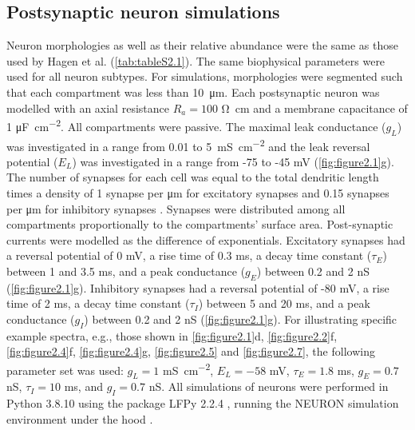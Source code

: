 \subsection{Postsynaptic neuron simulations}
Neuron morphologies as well as their relative abundance were the same as those used by Hagen et al. \cite{Hagen2016} (\autoref{tab:tableS2.1}). The same biophysical parameters were used for all neuron subtypes. For simulations, morphologies were segmented such that each compartment was less than \qty{10}{\micro\meter}. Each postsynaptic neuron was modelled with an axial resistance $R_a=100$ \unit{\ohm \centi\meter} and a membrane capacitance of 1 \unit{\micro\farad\per\centi\meter\squared}. All compartments were passive. The maximal leak conductance ($g_L$) was investigated in a range from 0.01 to \qty{5}{\milli\siemens\per\centi\meter\squared} and the leak reversal potential ($E_L$) was investigated in a range from -75 to -45 \unit{\milli\volt} (\autoref{fig:figure2.1}g). The number of synapses for each cell was equal to the total dendritic length times a density of 1 synapse per \unit{\micro\meter} for excitatory synapses and 0.15 synapses per \unit{\micro\meter} for inhibitory synapses \cite{Iacaruso2017, Karimi2020, Palmer2012}. Synapses were distributed among all compartments proportionally to the compartments’ surface area. Post-synaptic currents were modelled as the difference of exponentials. Excitatory synapses had a reversal potential of 0 \unit{\milli\volt}, a rise time of 0.3 ms, a decay time constant ($\tau_E$) between 1 and 3.5 ms, and a peak conductance ($g_E$) between 0.2 and 2 \unit{\nano\siemens} (\autoref{fig:figure2.1}g). Inhibitory synapses had a reversal potential of -80 \unit{\milli\volt}, a rise time of 2 ms, a decay time constant ($\tau_I$) between 5 and 20 ms, and a peak conductance ($g_I$) between 0.2 and 2 \unit{\nano\siemens} (\autoref{fig:figure2.1}g). For illustrating specific example spectra, e.g., those shown in \autoref{fig:figure2.1}d, \ref{fig:figure2.2}f, \ref{fig:figure2.4}f, \ref{fig:figure2.4}g, \ref{fig:figure2.5} and \ref{fig:figure2.7}, the following parameter set was used: $g_L = 1$ \unit{\milli\siemens\per\centi\meter\squared}, $E_L = -58$ \unit{\milli\volt}, $\tau_E = 1.8$ ms, $g_E = 0.7$ \unit{\nano\siemens}, $\tau_I = 10$ \unit{\milli\second}, and $g_I = 0.7$ \unit{\nano\siemens}. All simulations of neurons were performed in Python 3.8.10 using the package LFPy 2.2.4 \cite{Hagen2018}, running the NEURON simulation environment under the hood \cite{Carnevale2006}.

